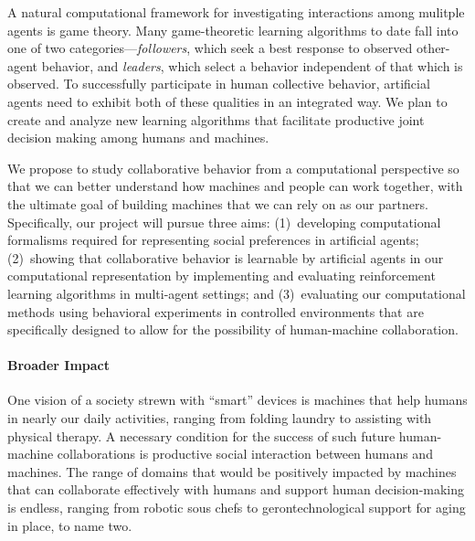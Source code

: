 A natural computational framework for investigating interactions among
mulitple agents is game theory. Many game-theoretic learning
algorithms to date fall into one of two categories---\emph{followers},
which seek a best response to observed other-agent behavior,
and \emph{leaders}, which select a behavior independent of that which
is observed. To successfully participate in human collective behavior,
artificial agents need to exhibit both of these qualities in an
integrated way. We plan to create and analyze new learning algorithms
that facilitate productive joint decision making among humans and
machines.


We propose to study collaborative behavior from a computational perspective so
that we can better understand how machines and people can work
together, with the ultimate goal of building machines that we can rely
on as our partners. Specifically, our project will pursue three aims:
%
(1)~developing computational formalisms required for representing
social preferences in artificial agents; (2)~showing that
collaborative behavior is learnable by artificial agents in our
computational representation by implementing and evaluating
reinforcement learning algorithms in multi-agent settings; and
(3)~evaluating our computational methods using behavioral experiments
in controlled environments that are specifically designed to allow for
the possibility of human-machine collaboration.



\vspace{\up}
\paragraph{Broader Impact}

One vision of a society strewn with ``smart'' devices is
machines that help humans in nearly our daily activities, 
ranging from folding laundry to assisting with physical therapy.
A necessary condition for the success of such future human-machine collaborations 
is productive social interaction between humans and machines.  
%
The range of domains that would be positively impacted by machines
that can collaborate effectively with humans and support human
decision-making is endless, ranging from robotic sous chefs to
gerontechnological support for aging in place, to name two.

